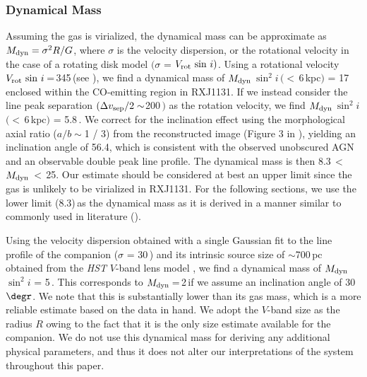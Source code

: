 \documentclass[]{emulateapj}
\begin{document}
\subsubsection{Dynamical Mass}
Assuming the gas is virialized,
the dynamical mass can be approximate as
$M_{\rm dyn} = \sigma^2 R / G$,
where $\sigma$ is the velocity dispersion, or the rotational velocity in the case of a rotating disk model
$($\ie $\sigma$ = $V_{\rm rot}\, \sin\, i)$.
Using a rotational velocity $V_{\rm rot} \, \sin\, i$\,=\,345\,\kms (see ),  %
we find a dynamical mass of
$M_{\rm dyn}$\,$\sin^2 i$\,$(<$\,6\,kpc$)$ = 17\,\Msun enclosed
within the CO-emitting region in RXJ1131.
If we instead consider the
\bco line peak separation $(\Delta v_{\rm sep}/2 \sim$200\,\kms$)$ as the rotation velocity, we find
$M_{\rm dyn}$\,$\sin^2 i$\,$(<$\,6\,kpc$)$ = 5.8\,\Msun.
We correct for the inclination effect using the
morphological axial ratio ($a/b\sim$1 / 3)
from the reconstructed image (Figure 3 in ), yielding
an inclination angle of 56.4\degr, which is consistent with the
observed unobscured AGN and an observable double peak line profile.
The dynamical mass is then
8.3\Msun\,$<$\,$M_{\rm dyn}$\,$<$\,25\Msun.
Our estimate should be considered at best an upper limit since
the gas is unlikely to be virialized in RXJ1131.
For the following sections, we use the
lower limit (8.3)\,\Msun as the dynamical mass as it is
derived in a manner similar to commonly used in literature (\eg {}).

Using the velocity dispersion obtained with a single Gaussian fit to the
line profile of the companion ($\sigma$ = 30\,\kms)
and its intrinsic source size of $\sim$700\,pc obtained from the {\em HST}
$V$-band lens model ,
we find a dynamical mass of $M_{\rm dyn}$\,$\sin^2 i$ = 5\,\Msun.
This corresponds to $M_{\rm dyn}$\,=\,2\,\Msun if we assume an
inclination angle of 30$\degr$.
We note that this is substantially lower than its gas mass, which is a more reliable estimate based on
the data in hand.
We adopt the $V$-band size as the radius $R$ owing to the fact that
it is the only size estimate available for the companion.
We do not use this dynamical mass for deriving any additional physical parameters, and thus it
does not alter our interpretations of the system throughout this paper.
\end{document}
